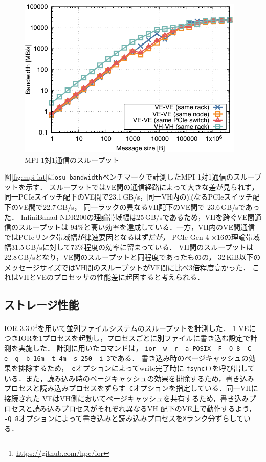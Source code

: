 ﻿\documentclass[submit,techrep,noauthor]{ipsj}
\begin{document}
\begin{figure}[tb]
  \centering
  \includegraphics{figs/mpi_bandwidth.pdf}
  \caption{MPI 1対1通信のスループット}\label{fig:bw}
\end{figure}

図\ref{fig:mpi-lat}に\verb|osu_bandwidth|ベンチマークで計測したMPI 1対1通信のスループットを示す．
スループットではVE間の通信経路によって大きな差が見られず，
同一PCIeスイッチ配下のVE間で23.1\,GB/s，同一VH内の異なるPCIeスイッチ配下のVE間で22.7\,GB/s，
同一ラックの異なるVH配下のVE間で 23.6\,GB/sであった．
InfiniBanad NDR200の理論帯域幅は25\,GB/sであるため，VHを跨ぐVE間通信のスループットは
94\%と高い効率を達成している．一方，VH内のVE間通信ではPCIeリンク帯域幅が律速要因となるはずだが，
PCIe Gen 4 $\times$16の理論帯域幅31.5\,GB/sに対して73\%程度の効率に留まっている．
VH間のスループットは22.8\,GB/sとなり，VE間のスループットと同程度であったものの，
32\,KiB以下のメッセージサイズではVH間のスループットがVE間に比べ3倍程度高かった．
これはVHとVEのプロセッサの性能差に起因すると考えられる．

\subsection{ストレージ性能}\label{sec:storage}

IOR 3.3.0\footnote{\url{https://github.com/hpc/ior}}を用いて並列ファイルシステムのスループットを計測した．
1 VEにつきIORを1プロセスを起動し，プロセスごとに別ファイルに書き込む設定で計測を実施した．
計測に用いたコマンドは，
\texttt{ior -w -r -a POSIX -F -Q 8 -C -e -g -b 16m -t 4m -s 250 -i 3}である．
書き込み時のページキャッシュの効果を排除するため，\texttt{-e}オプションによってwrite完了時に
\texttt{fsync()}を呼び出している．また，読み込み時のページキャッシュの効果を排除するため，書き込み
プロセスと読み込みプロセスをずらす\texttt{-C}オプションを指定している．同一VHに接続された
VEはVH側においてページキャッシュを共有するため，書き込みプロセスと読み込みプロセスがそれぞれ異なるVH
配下のVE上で動作するよう，
\texttt{-Q 8}オプションによって書き込みと読み込みプロセスを8ランク分ずらしている．
\end{document}
